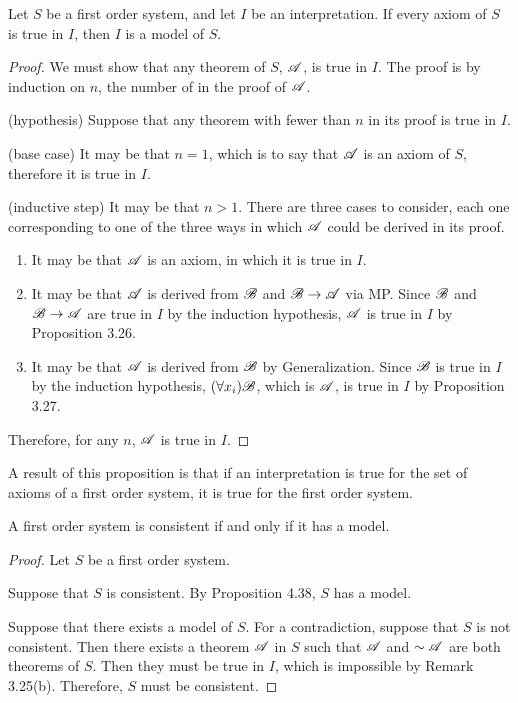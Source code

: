 \begin{proposition}
  Let \(S\) be a first order system, and let \(I\) be an interpretation. If every axiom of \(S\) is true in \(I\), then \(I\) is a model of \(S\).

  \begin{proof}
    We must show that any theorem of \(S\), \(\mathscr{A}\), is true in \(I\). The proof is by induction on \(n\), the number of \wfs{} in the proof of \(\mathscr{A}\).

    (hypothesis) Suppose that any theorem with fewer than \(n\) \wfs{} in its proof is true in \(I\).

    (base case) It may be that \(n=1\), which is to say that \(\mathscr{A}\) is an axiom of \(S\), therefore it is true in \(I\).

    (inductive step) It may be that \(n>1\). There are three cases to consider, each one corresponding to one of the three ways in which \(\mathscr{A}\) could be derived in its proof.
    \begin{enumerate}
      \item It may be that \(\mathscr{A}\) is an axiom, in which it is true in \(I\).

      \item It may be that \(\mathscr{A}\) is derived from \(\mathscr{B}\) and \(\mathscr{B} \rightarrow \mathscr{A}\) via MP. Since \(\mathscr{B}\) and \(\mathscr{B} \rightarrow \mathscr{A}\) are true in \(I\) by the induction hypothesis, \(\mathscr{A}\) is true in \(I\) by Proposition 3.26.

      \item It may be that \(\mathscr{A}\) is derived from \(\mathscr{B}\) by Generalization. Since \(\mathscr{B}\) is true in \(I\) by the induction hypothesis, \((\forall x_i)\mathscr{B}\), which is \(\mathscr{A}\), is true in \(I\) by Proposition 3.27.
    \end{enumerate}

  Therefore, for any \(n\), \(\mathscr{A}\) is true in \(I\).
  \end{proof}
\end{proposition}

A result of this proposition is that if an interpretation is true for the set of axioms of a first order system, it is true for the first order system.

\begin{proposition}
  A first order system is consistent if and only if it has a model.

  \begin{proof}
    Let \(S\) be a first order system.

    \Ra{} Suppose that \(S\) is consistent. By Proposition 4.38, \(S\) has a model.

    \La{} Suppose that there exists a model of \(S\). For a contradiction, suppose that \(S\) is not consistent. Then there exists a theorem \(\mathscr{A}\) in \(S\) such that \(\mathscr{A}\) and \(\sim\mathscr{A}\) are both theorems of \(S\). Then they must be true in \(I\), which is impossible by Remark 3.25(b). Therefore, \(S\) must be consistent.
  \end{proof}
\end{proposition}

